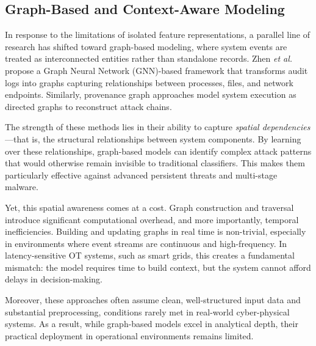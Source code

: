 \documentclass[conference]{IEEEtran}
\begin{document}
\subsection{Graph-Based and Context-Aware Modeling}

In response to the limitations of isolated feature representations, a parallel line of research has shifted toward graph-based modeling, where system events are treated as interconnected entities rather than standalone records. Zhen \textit{et al.} \cite{zhen2025} propose a Graph Neural Network (GNN)-based framework that transforms audit logs into graphs capturing relationships between processes, files, and network endpoints. Similarly, provenance graph approaches model system execution as directed graphs to reconstruct attack chains.

The strength of these methods lies in their ability to capture \textit{spatial dependencies}—that is, the structural relationships between system components. By learning over these relationships, graph-based models can identify complex attack patterns that would otherwise remain invisible to traditional classifiers. This makes them particularly effective against advanced persistent threats and multi-stage malware.

Yet, this spatial awareness comes at a cost. Graph construction and traversal introduce significant computational overhead, and more importantly, temporal inefficiencies. Building and updating graphs in real time is non-trivial, especially in environments where event streams are continuous and high-frequency. In latency-sensitive OT systems, such as smart grids, this creates a fundamental mismatch: the model requires time to build context, but the system cannot afford delays in decision-making.

Moreover, these approaches often assume clean, well-structured input data and substantial preprocessing, conditions rarely met in real-world cyber-physical systems. As a result, while graph-based models excel in analytical depth, their practical deployment in operational environments remains limited.
\end{document}
